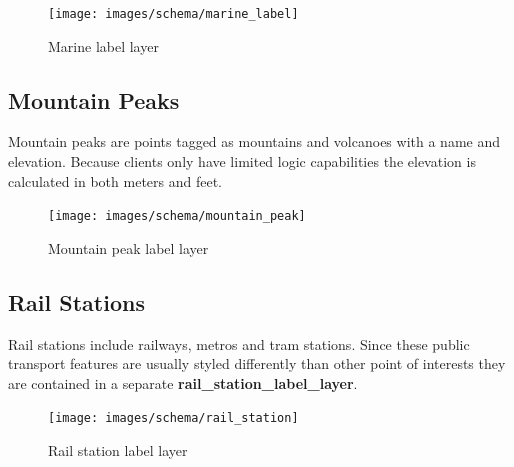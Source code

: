 \begin{figure}[H]
  \centering
  \texttt{[image: images/schema/marine\_label]}
  \caption{Marine label layer}
\end{figure}

\subsection{Mountain Peaks}

Mountain peaks are points tagged as mountains and volcanoes with a name and elevation. Because clients only have limited logic capabilities the elevation is calculated in both meters and feet.

\begin{figure}[H]
  \centering
  \texttt{[image: images/schema/mountain\_peak]}
  \caption{Mountain peak label layer}
\end{figure}

\subsection{Rail Stations}

Rail stations include railways, metros and tram stations. Since these
public transport features are usually styled differently than other point of
interests they are contained in a separate \textbf{rail\_station\_label\_layer}.

\begin{figure}[H]
  \centering
  \texttt{[image: images/schema/rail\_station]}
  \caption{Rail station label layer}
\end{figure}